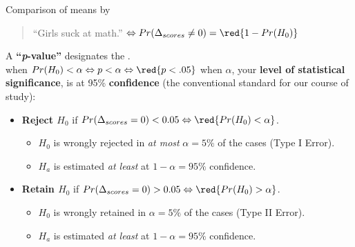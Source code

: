 \documentclass{beamer}
\begin{document}
	\begin{frame}[t]{Comparison of means by }
					
		\begin{quote}
		``Girls suck at math.'' $\Leftrightarrow Pr(\Delta_{scores} \neq 0) = \red{1 - Pr(H_0)}$
		\end{quote}
		
		A \textbf{``\textit{p}-value''} designates the .\\[1em]
		
		 when $Pr(H_0) < \alpha \Leftrightarrow p < \alpha \Leftrightarrow \red{p < .05}$ when $\alpha$, your \textbf{level of statistical significance}, is at 95\% \textbf{confidence} (the conventional standard for our course of study):
		
		\begin{itemize}
			\item \textbf{Reject $H_0$} if $Pr(\Delta_{scores}=0) < 0.05 \Leftrightarrow \red{Pr(H_0) < \alpha}$.
			
			\begin{itemize}
				\item $H_0$ is wrongly rejected in \textit{at most} $\alpha = 5\%$ of the cases (Type I Error).
				\item $H_a$ is estimated  \textit{at least} at $1-\alpha=95\%$ confidence.
			\end{itemize}

			\item \textbf{Retain $H_0$} if $Pr(\Delta_{scores}=0) > 0.05 \Leftrightarrow \red{Pr(H_0) > \alpha}$.\\
			\begin{itemize}
				\item $H_0$ is wrongly retained in $\alpha = 5\%$ of the cases (Type II Error).
				\item $H_a$ is estimated  \textit{at least} at $1-\alpha=95\%$ confidence.
			\end{itemize}
		\end{itemize}
	\end{frame}	
\end{document}
